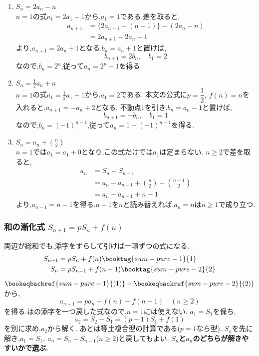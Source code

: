 \noindent{}\par\nobreak
\begin{enumerate}[label=(\arabic*),parsep=3pt,format=\bookitemlink{example-summation-1}{solution}{problem}]
  \item $\displaystyle S_n=2a_n-n$\\
    $n=1$の式$a_1=2a_1-1$から,$a_1=1$である.差を取ると,
    \begin{align*}
      a_{n+1}&=\{2a_{n+1}-(n+1)\}-(2a_n-n)\\
      &=2a_{n+1}-2a_n-1
    \end{align*}
    より,$a_{n+1}=2a_n+1$となる.$b_n=a_n+1$と置けば,
    \[
      b_{n+1}=2b_n,\quad b_1=2
    \]
    なので,$b_n=2^n$,従って$a_n=2^n-1$を得る.
  \item $\displaystyle S_n=\frac12a_n+n$\\
    $n=1$の式$a_1=\frac12a_1+1$から,$a_1=2$である.
    本文の公式に$p=\dfrac{1}{2},\ f(n)=n$を入れると,$a_{n+1}=-a_n+2$となる.
    不動点$1$を引き,$b_n=a_n-1$と置けば,
    \[
      b_{n+1}=-b_n,\quad b_1=1
    \]
    なので,$b_n=(-1)^{n-1}$,従って$a_n=1+(-1)^{n-1}$を得る.
  \item $\displaystyle S_n=a_n+\binom n2$\\
    $n=1$では$a_1=a_1+0$となり,この式だけでは$a_1$は定まらない.
    $n\ge2$で差を取ると,
    \begin{align*}
      a_n&=S_n-S_{n-1}\\
      &=a_n-a_{n-1}+\binom n2-\binom{n-1}2\\
      &=a_n-a_{n-1}+n-1
    \end{align*}
    より,$a_{n-1}=n-1$を得る.$n-1$を$n$と読み替えれば,$a_n=n$は$n\ge1$で成り立つ.
\end{enumerate}

\subsubsection{\texorpdfstring{和の漸化式  $S_{n+1}=pS_n+f(n) $}{和の漸化式}}
両辺が総和でも,添字をずらして引けば一項ずつの式になる.
\begin{align*}
  S_{n+1}&=pS_n+f(n) \booktag{sum-pure-1}{1}\\
  S_n&=pS_{n-1}+f(n-1) \booktag{sum-pure-2}{2}
\end{align*}
$\bookeqbackref{sum-pure-1}{(1)}-\bookeqbackref{sum-pure-2}{(2)}$から,
\[
  a_{n+1}=pa_n+f(n)-f(n-1)\quad(n\ge2)
\]
を得る.はの添字を一つ戻した式なので,$n=1$には使えない.
$a_1=S_1$を保ち,
\[
  a_2=S_2-S_1=(p-1)S_1+f(1)
\]
を別に求め,$a_2$から解く.
あとは等比複合型の計算である($p=1$なら型).
$S_n$を先に解き,$a_1=S_1,\ a_n=S_n-S_{n-1}$($n\ge2$)と戻してもよい.
\textbf{$S_n$と$a_n$のどちらが解きやすいかで選ぶ.}

